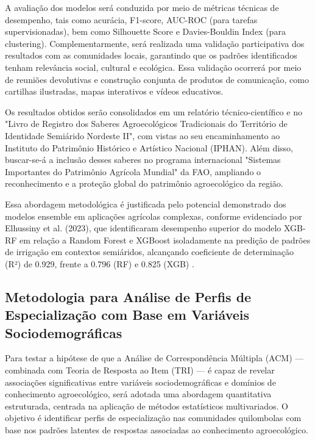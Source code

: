 A avaliação dos modelos será conduzida por meio de métricas técnicas de desempenho, tais como acurácia, F1-score, AUC-ROC (para tarefas supervisionadas), bem como Silhouette Score e Davies-Bouldin Index (para clustering). Complementarmente, será realizada uma validação participativa dos resultados com as comunidades locais, garantindo que os padrões identificados tenham relevância social, cultural e ecológica. Essa validação ocorrerá por meio de reuniões devolutivas e construção conjunta de produtos de comunicação, como cartilhas ilustradas, mapas interativos e vídeos educativos.

Os resultados obtidos serão consolidados em um relatório técnico-científico e no "Livro de Registro dos Saberes Agroecológicos Tradicionais do Território de Identidade Semiárido Nordeste II", com vistas ao seu encaminhamento ao Instituto do Patrimônio Histórico e Artístico Nacional (IPHAN). Além disso, buscar-se-á a inclusão desses saberes no programa internacional "Sistemas Importantes do Patrimônio Agrícola Mundial" da FAO, ampliando o reconhecimento e a proteção global do patrimônio agroecológico da região.

Essa abordagem metodológica é justificada pelo potencial demonstrado dos modelos ensemble em aplicações agrícolas complexas, conforme evidenciado por Elhussiny et al. (2023), que identificaram desempenho superior do modelo XGB-RF em relação a Random Forest e XGBoost isoladamente na predição de padrões de irrigação em contextos semiáridos, alcançando coeficiente de determinação (R²) de 0.929, frente a 0.796 (RF) e 0.825 (XGB) \cite{Elhussiny2023}.






\subsection{Metodologia para Análise de Perfis de Especialização com Base em Variáveis Sociodemográficas}

Para testar a hipótese de que a Análise de Correspondência Múltipla (ACM) — combinada com Teoria de Resposta ao Item (TRI) — é capaz de revelar associações significativas entre variáveis sociodemográficas e domínios de conhecimento agroecológico, será adotada uma abordagem quantitativa estruturada, centrada na aplicação de métodos estatísticos multivariados. O objetivo é identificar perfis de especialização nas comunidades quilombolas com base nos padrões latentes de respostas associadas ao conhecimento agroecológico.

